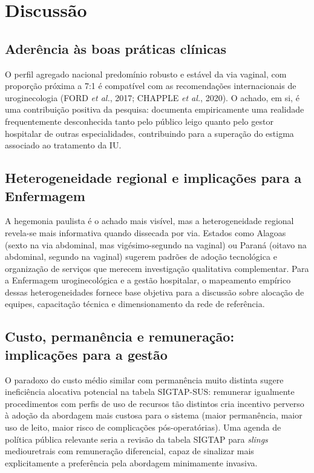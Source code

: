 \documentclass[12pt,a4paper,oneside]{article}
\begin{document}
\section{Discussão}\label{sec:discussao}

\subsection{Aderência às boas práticas clínicas}

O perfil agregado nacional \textemdash{} predomínio robusto e estável
da via vaginal, com proporção próxima a 7:1 \textemdash{} é compatível
com as recomendações internacionais de uroginecologia (FORD
\textit{et al.}, 2017; CHAPPLE \textit{et al.}, 2020). O achado, em
si, é uma contribuição positiva da pesquisa: documenta empiricamente
uma realidade frequentemente desconhecida tanto pelo público leigo
quanto pelo gestor hospitalar de outras especialidades, contribuindo
para a superação do estigma associado ao tratamento da IU.

\subsection{Heterogeneidade regional e implicações para a Enfermagem}

A hegemonia paulista é o achado mais visível, mas a heterogeneidade
regional revela-se mais informativa quando dissecada por via. Estados
como Alagoas (sexto na via abdominal, mas vigésimo-segundo na vaginal)
ou Paraná (oitavo na abdominal, segundo na vaginal) sugerem padrões de
adoção tecnológica e organização de serviços que merecem investigação
qualitativa complementar. Para a Enfermagem uroginecológica e a
gestão hospitalar, o mapeamento empírico dessas heterogeneidades
fornece base objetiva para a discussão sobre alocação de equipes,
capacitação técnica e dimensionamento da rede de referência.

\subsection{Custo, permanência e remuneração: implicações para a gestão}

O paradoxo do custo médio similar com permanência muito distinta
sugere ineficiência alocativa potencial na tabela SIGTAP-SUS:
remunerar igualmente procedimentos com perfis de uso de recursos tão
distintos cria incentivo perverso à adoção da abordagem mais
custosa para o sistema (maior permanência, maior uso de leito, maior
risco de complicações pós-operatórias). Uma agenda de política
pública relevante seria a revisão da tabela SIGTAP para
\textit{slings} mediouretrais com remuneração diferencial, capaz de
sinalizar mais explicitamente a preferência pela abordagem
minimamente invasiva.
\end{document}
